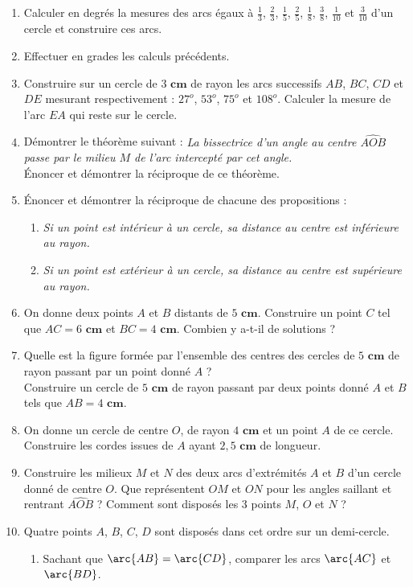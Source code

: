 \documentclass[12 pt]{report}
\theoremstyle{plain}
\newcounter{n}
\newcommand{\cm}{\textbf{ cm}}
\begin{document}
\begin{enumerate}
\item Calculer en degrés la mesures des arcs égaux à $\frac13$, $\frac23$, $\frac15$, $\frac25$, $\frac18$, $\frac38$, $\frac1{10}$ et $\frac3{10}$ d'un cercle et construire ces arcs.
\item Effectuer en grades les calculs précédents.
\item Construire sur un cercle de $3\cm$ de rayon les arcs successifs $AB$, $BC$, $CD$ et $DE$ mesurant respectivement : $27^o$, $53^o$, $75^o$ et $108^o$. Calculer la mesure de l'arc $EA$ qui reste sur le cercle. 
\item Démontrer le théorème suivant : \emph{La bissectrice d'un angle au centre $\widehat{AOB}$ passe par le milieu $M$ de l'arc intercepté par cet angle.}\\ Énoncer et démontrer la réciproque de ce théorème. 
\item Énoncer et démontrer la réciproque de chacune des propositions : 
\begin{enumerate}
\item \emph{Si un point est intérieur à un cercle, sa distance au centre est inférieure au rayon.}
\item \emph{Si un point est extérieur à un cercle, sa distance au centre est supérieure au rayon.}
\end{enumerate}
\item On donne deux points $A$ et $B$ distants de $5\cm$. Construire un point $C$ tel que $AC= 6\cm$ et $BC = 4\cm$. Combien y a-t-il de solutions ?
\item Quelle est la figure formée par l'ensemble des centres des cercles de $5\cm$ de rayon passant par un point donné $A$ ? \\
Construire un cercle de $5\cm$ de rayon passant par deux points donné $A$ et $B$ tels que $AB=4\cm$. 
\item On donne un cercle de centre $O$, de rayon $4\cm$ et un point $A$ de ce cercle. Construire les cordes issues de $A$ ayant $2,5\cm$ de longueur. 
\item Construire les milieux $M$ et $N$ des deux arcs d'extrémités $A$ 
et $B$ d'un cercle donné de centre $O$. Que représentent $OM$ et $ON$ pour les angles saillant et rentrant $\widehat{AOB}$ ? Comment sont disposés les 3 points $M$, $O$ et $N$ ?
\item Quatre points $A$, $B$, $C$, $D$ sont disposés dans cet ordre sur un demi-cercle. \begin{enumerate}
\item Sachant que $\arc{AB}= \arc{CD}$, comparer les arcs $\arc{AC}$ et $\arc{BD}$. 

\end{enumerate}
\end{enumerate}
\end{document}
